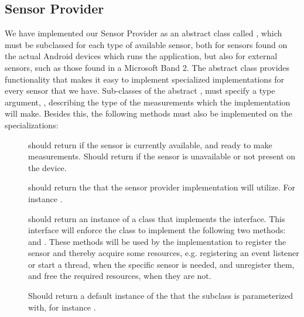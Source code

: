 \subsection{Sensor Provider}
\label{sub:providing_sensor_data_implementation}
We have implemented our Sensor Provider as an abstract class called , which must be subclassed for each type of available sensor, both for sensors found on the actual Android devices which runs the application, but also for external sensors, such as those found in a Microsoft Band 2. The abstract class provides functionality that makes it easy to implement specialized implementations for every sensor that we have. Sub-classes of the abstract , must specify a type argument, , describing the type of the measurements which the implementation will make. Besides this, the following methods must also be implemented on the specializations:


\begin{description}
	\item[] should return  if the sensor is currently available, and ready to make measurements. Should return  if the sensor is unavailable or not present on the device.

	\item[] should return the  that the sensor provider implementation will utilize. For instance .

	\item[] should return an instance of a class that implements the  interface. This interface will enforce the class to implement the following two methods:  and . These methods will be used by the  implementation to register the sensor and thereby acquire some resources, e.g. registering an event listener or start a thread, when the specific sensor is needed, and unregister them, and free the required resources, when they are not.

  \item[] Should return a default instance of the  that the subclass is parameterized with, for instance .
\end{description}


